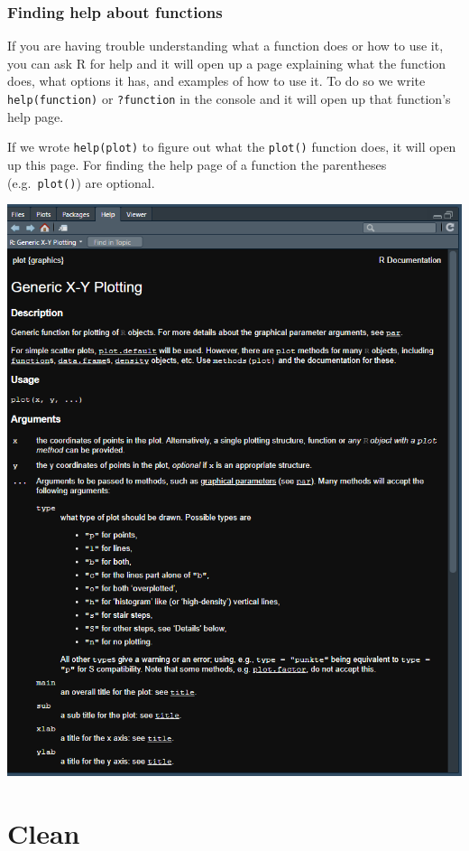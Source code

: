 \documentclass[
  12pt,
]{book}
\begin{document}
\hypertarget{finding-help-about-functions}{%
\section{Finding help about functions}\label{finding-help-about-functions}}

If you are having trouble understanding what a function does or how to use it, you can ask R for help and it will open up a page explaining what the function does, what options it has, and examples of how to use it. To do so we write \texttt{help(function)} or \texttt{?function} in the console and it will open up that function's help page.

If we wrote \texttt{help(plot)} to figure out what the \texttt{plot()} function does, it will open up this page. For finding the help page of a function the parentheses (e.g.~\texttt{plot()}) are optional.

\includegraphics{images/help_page.PNG}

\hypertarget{part-clean}{%
\part{Clean}\label{part-clean}}
\end{document}

